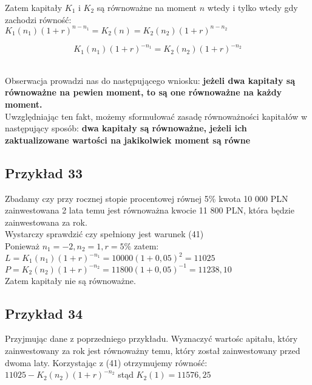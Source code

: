 \documentclass{article}
\begin{document}
Zatem kapitały $ K_1 $ i $ K_2 $ są równoważne na moment $ n $ wtedy i tylko wtedy gdy zachodzi równość:\\

$ K_1(n_1)(1 + r)^{n-n_1} = K_2(n) = K_2(n_2)(1 + r)^{n-n_2} $\\

\begin{center}
	\begin{equation}
		K_1(n_1)(1+r)^{-n_1} = K_2(n_2)(1+r)^{-n_2}
	\end{equation}
\end{center}\\

Obserwacja prowadzi nas do następującego wniosku: \textbf{jeżeli dwa kapitały są równoważne na pewien moment, to są one równoważne na każdy moment.}\\

Uwzględniając ten fakt, możemy sformułować zasadę równoważności kapitałów w następujący sposób: \textbf{dwa kapitały są równoważne, jeżeli ich zaktualizowane wartości na jakikolwiek moment są równe}\\

\subsection{Przykład 33}
Zbadamy czy przy rocznej stopie procentowej równej 5\% kwota 10 000 PLN zainwestowana 2 lata temu jest równoważna kwocie 11 800 PLN, która będzie zainwestowana za rok.\\

Wystarczy sprawdzić czy spełniony jest warunek (41)\\

Ponieważ $ n_1 = -2, n_2 = 1, r=5\% $ zatem:\\

$ L = K_1(n_1)(1+r)^{-n_1} = 10 000(1 + 0,05)^2 = 11 025 $\\

$ P = K_2(n_2)(1+r)^{-n_2} = 11 800(1 + 0,05)^{-1} = 11 238,10 $\\

Zatem kapitały nie są równoważne.\\

\subsection{Przykład 34}
Przyjmując dane z poprzedniego przykładu. Wyznaczyć wartośc apitału, który zainwestowany za rok jest równoważny temu, który został zainwestowany przed dwoma laty. Korzystając z (41) otrzymujemy równość: $ 11 025 - K_2(n_2)(1+r)^{-n_2} $ stąd $ K_2(1) = 11 576,25  $\\
\end{document}
